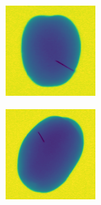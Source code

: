 \documentclass[11pt]{article}
\begin{document}
\clearpage
    \begin{figure}[!h]
    \captionsetup[subfigure]{labelformat=empty}
    \ContinuedFloat
    \captionsetup{list=no}
    \begin{subfigure}[b]{0.22\textwidth}
         \centering
         \includegraphics[width=\textwidth]{figurer/potato_dataset/metal/metal_44.jpg}
         \caption{}
         \label{fig:metal_44}
     \end{subfigure}
     \hfill
     \begin{subfigure}[b]{0.22\textwidth}
         \centering
         \includegraphics[width=\textwidth]{figurer/potato_dataset/metal/metal_45.jpg}

\end{subfigure}
\end{figure}
\end{document}

